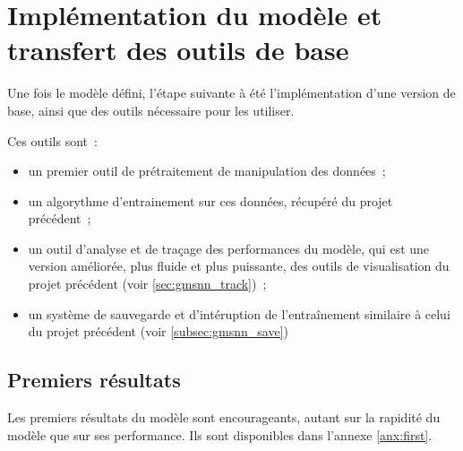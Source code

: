 \section{Implémentation du modèle et transfert des outils de base}
Une fois le modèle défini, l'étape suivante à été l'implémentation d'une version de base, ainsi que des outils nécessaire pour les utiliser.

Ces outils sont~:
\begin{itemize}
	\item un premier outil de prétraitement de manipulation des données~;
	\item un algorythme d'entrainement sur ces données, récupéré du projet précédent~;
	\item un outil d'analyse et de traçage des performances du modèle, qui est une version améliorée, plus fluide et plus puissante, des outils de visualisation du projet précédent (voir \autoref{sec:gmsnn_track})~;
	\item un système de sauvegarde et d'intéruption de l'entraînement similaire à celui du projet précédent (voir \autoref{subsec:gmsnn_save})
\end{itemize}

\subsection{Premiers résultats}
Les premiers résultats du modèle sont encourageants, autant sur la rapidité du modèle que sur ses performance.
Ils sont disponibles dans l'annexe \ref{anx:first}.
